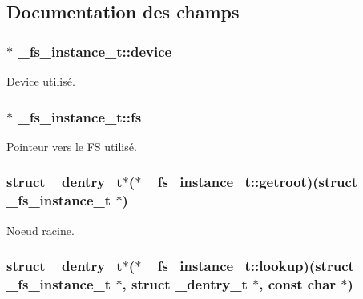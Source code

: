 \subsection{Documentation des champs}
\hypertarget{struct__fs__instance__t_acc3db122838752a84c6ecb93c3644256}{
\subsubsection[{device}]{$\ast$ \-\_\-fs\-\_\-instance\-\_\-t\-::device}}\label{struct__fs__instance__t_acc3db122838752a84c6ecb93c3644256}
Device utilisé. \hypertarget{struct__fs__instance__t_a209ef4e2ed00460eead263311373a974}{
\subsubsection[{fs}]{$\ast$ \-\_\-fs\-\_\-instance\-\_\-t\-::fs}}\label{struct__fs__instance__t_a209ef4e2ed00460eead263311373a974}
Pointeur vers le F\-S utilisé. \hypertarget{struct__fs__instance__t_af6891a9d9e5c2fd0458312fd8567213a}{
\subsubsection[{getroot}]{\setlength{\rightskip}{0pt plus 5cm}struct {\bf \-\_\-dentry\-\_\-t}$\ast$($\ast$ \-\_\-fs\-\_\-instance\-\_\-t\-::getroot)(struct {\bf \-\_\-fs\-\_\-instance\-\_\-t} $\ast$)\hspace{0.3cm}{\ttfamily [read]}}}\label{struct__fs__instance__t_af6891a9d9e5c2fd0458312fd8567213a}
Noeud racine. \hypertarget{struct__fs__instance__t_a820510562ecb31cbbf6b4fc8a4d2ce6a}{
\subsubsection[{lookup}]{\setlength{\rightskip}{0pt plus 5cm}struct {\bf \-\_\-dentry\-\_\-t}$\ast$($\ast$ \-\_\-fs\-\_\-instance\-\_\-t\-::lookup)(struct {\bf \-\_\-fs\-\_\-instance\-\_\-t} $\ast$, struct {\bf \-\_\-dentry\-\_\-t} $\ast$, const char $\ast$)\hspace{0.3cm}{\ttfamily [read]}}}\label{struct__fs__instance__t_a820510562ecb31cbbf6b4fc8a4d2ce6a}
